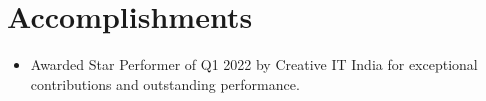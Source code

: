 \documentclass[letterpaper,11pt]{article}
\newcommand{\resumeItem}[2]{
  \item\small{
    \textbf{#1}{ #2 \vspace{-2pt}}
  }
}
\newcommand{\resumeSubItem}[2]{\resumeItem{#1}{#2}\vspace{-4pt}}
\newcommand{\resumeSubHeadingListStart}{\begin{itemize}[leftmargin=*]}
\newcommand{\resumeSubHeadingListEnd}{\end{itemize}}
\begin{document}
\section{Accomplishments}
 \resumeSubHeadingListStart
 \resumeSubItem{}
    {Awarded Star Performer of Q1 2022 by Creative IT India for exceptional contributions and outstanding performance.}
 \resumeSubHeadingListEnd
 
\end{document}
